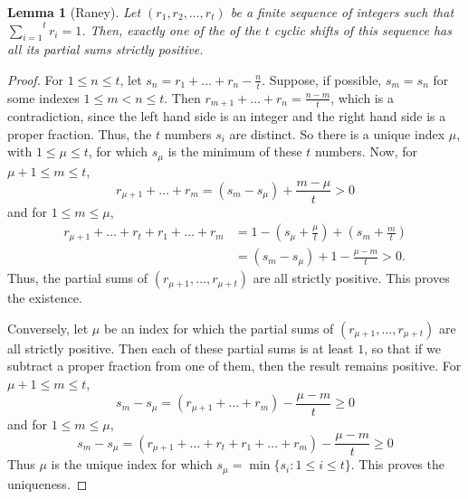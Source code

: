 \documentclass[a4paper,reqno,10pt]{amsart}
\newtheorem{lemma}[theorem]{Lemma}
\theoremstyle{definition}
\begin{document}
\begin{lemma}[Raney]\label{Raney_lemma}
Let $(r_{1},r_{2},\ldots,r_{t})$ be a finite sequence of integers such that $\overset{t}{\underset{i=1}\sum}r_{i}=1$. Then, exactly one of the of the $t$ cyclic shifts of this sequence has all its partial sums strictly positive.
\end{lemma}
\begin{proof}
For $1\leq n\leq t$, let $s_{n}=r_{1}+\ldots+r_{n}-\frac{n}{t}$. Suppose, if possible, $s_{m}=s_{n}$ for some indexes $1\leq m<n\leq t$. Then $r_{m+1}+\ldots+r_{n}=\frac{n-m}{t}$, which is a contradiction, since the left hand side is an integer and the right hand side is a proper fraction. Thus, the $t$ numbers $s_{i}$ are distinct. So there is a unique index $\mu$, with $1\leq\mu\leq t$, for which $s_{\mu}$ is the minimum of these $t$ numbers. Now, for $\mu+1\leq m\leq t$,
\begin{equation*}
r_{\mu+1}+\ldots+r_{m}=(s_{m}-s_{\mu})+\frac{m-\mu}{t}>0
\end{equation*}
and for $1\leq m\leq\mu$,
\begin{align*}
r_{\mu+1}+\ldots+r_{t}+r_{1}+\ldots+r_{m}&=1-(s_{\mu}+\frac{\mu}{t})+(s_{m}+\frac{m}{t})\\
&=(s_{m}-s_{\mu})+1-\frac{\mu-m}{t}>0.
\end{align*}
Thus, the partial sums of $(r_{\mu+1},\ldots,r_{\mu+t})$ are all strictly positive. This proves the existence.

Conversely, let $\mu$ be an index for which the partial sums of $(r_{\mu+1},\ldots,r_{\mu+t})$ are all strictly positive. Then each of these partial sums is at least $1$, so that if we subtract a proper fraction from one of them, then the result remains positive. For $\mu+1\leq m\leq t$, 
\begin{equation*}
s_{m}-s_{\mu}=(r_{\mu+1}+\ldots+r_{m})-\frac{\mu-m}{t}\geq0
\end{equation*}
and for $1\leq m\leq\mu$,
\begin{equation*}
s_{m}-s_{\mu}=(r_{\mu+1}+\ldots+r_{t}+r_{1}+\ldots+r_{m})-\frac{\mu-m}{t}\geq0
\end{equation*}
Thus $\mu$ is the unique index for which $s_{\mu}=\min\{s_{i}:1\leq i\leq t\}$. This proves the uniqueness.
\end{proof}
\end{document}
